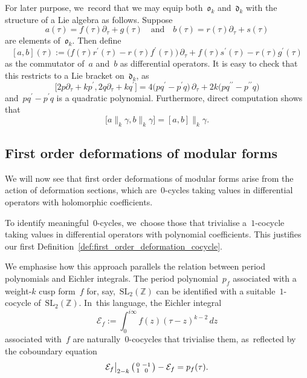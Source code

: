 \documentclass[10pt,a4paper]{article}
\numberwithin{equation}{section}
\theoremstyle{plain}
\theoremstyle{definition}
\newcommand{\tx}{\text}
\newcommand{\nbd}{\nobreakdash-\hspace{0pt}}
\newcommand{\bbZ}{\ensuremath{\mathbb{Z}}}
\newcommand{\cE}{\ensuremath{\mathcal{E}}}
\newcommand{\frakd}{\ensuremath{\mathfrak{d}}}
\newcommand{\frako}{\ensuremath{\mathfrak{o}}}
\newcommand{\defeq}{:=}
\newenvironment{psmatrix}{\bigl(\begin{smallmatrix}}{\end{smallmatrix}\bigr)}
\newcommand{\SL}[1]{\ensuremath{\mathrm{SL}_{#1}}}
\let\ga\gamma
\begin{document}
For later purpose, we~record that we may equip both~$\frako_k$ and~$\frakd_k$ with the structure of a Lie algebra as follows. Suppose
\begin{equation*}
a(\tau) = f(\tau)\partial_\tau + g(\tau)
\quad\tx{and}\quad
b(\tau) = r(\tau)\partial_\tau + s(\tau)
\end{equation*}
are elements of~$\frako_k$. Then define
\begin{equation}
\label{eq:def:lie_bracket_ok}
[a,b](\tau)
\defeq
\bigl(f(\tau)r^\prime(\tau) - r(\tau)f^\prime(\tau) \bigr)\,\partial_\tau
+ f(\tau)s^\prime(\tau) - r(\tau)g^\prime(\tau)
\end{equation}
as the commutator of~$a$ and~$b$ as differential operators. It is easy to check that this restricts to a Lie bracket on~$\frakd_k$, as
\begin{equation*}
\big[ 2p\partial_\tau + kp^\prime,2q\partial_\tau + kq^\prime \big]
=
4\bigl(pq^\prime - p^\prime q \bigr)\,\partial_\tau
+ 2k\bigl(pq^{\prime\prime} - p^{\prime\prime}q \bigr)
\end{equation*}
and~$pq^\prime - p^\prime q$ is a quadratic polynomial. Furthermore, direct computation shows that
\begin{equation}
\big[a\big\|_k \ga, b\big\|_k \ga \big] = [a,b]\big\|_k\ga
\tx{.}
\end{equation}

\subsection{First order deformations of modular forms}
\label{ssec:first_order_deformations_modular_forms}

We will now see that first order deformations of modular forms arise from the action of deformation sections, which are~$0$\nbd{}cycles taking values in differential operators with holomorphic coefficients.

To identify meaningful~$0$\nbd{}cycles, we~choose those that trivialise a~$1$\nbd{}cocycle taking values in differential operators with polynomial coefficients. This justifies our first Definition~\ref{def:first_order_deformation_cocycle}.

We emphasise how this approach parallels the relation between period polynomials and Eichler integrals. The period polynomial~$p_f$ associated with a weight\nbd{}$k$ cusp form~$f$ for, say,~$\SL{2}(\bbZ)$ can be identified with a suitable~$1$\nbd{}cocycle of~$\SL{2}(\bbZ)$. In~this language, the Eichler integral~
\[
\cE_f:= \int_0^{i\infty} f(z)(\tau-z)^{k-2}\, dz\]
associated with~$f$ are naturally~$0$\nbd{}cocycles that trivialise them, as~reflected by the coboundary equation
\begin{equation*}
\cE_f \big|_{2-k}\,\begin{psmatrix} 0 & -1 \\ 1 & 0 \end{psmatrix}
-
\cE_f
=
p_f(\tau)
\tx{.}
\end{equation*}
\end{document}
